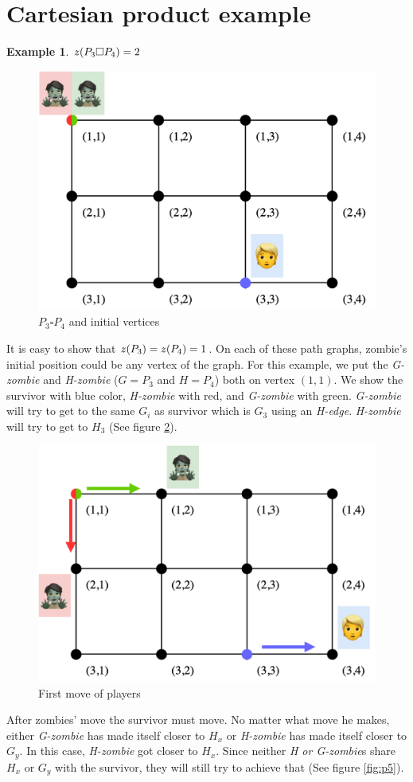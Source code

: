 \documentclass[1p]{elsarticle}
\newtheorem{example}[theorem]{Example}
\newcommand{\zn}{\ooalign{$z$\cr\hfil\rule[.5ex]{.2em}{.08ex}\hfil\cr}}
\begin{document}
\newpage
\appendix
\section{Cartesian product example} \label{cartesianProductExample}
\begin{example} $\zn(P_3 \square P_4 ) = 2$
\end{example}

\begin{figure}[h!]
	\centering
	\includegraphics[width=0.5\linewidth]{fig/p34m1.png}
	\caption{$P_3 \square P_4$ and initial vertices}
	\label{fig:p3}
\end{figure}

It is easy to show that $\zn(P_3) = \zn(P_4) = 1$. On each of these path graphs, zombie's initial position could be any
vertex of the graph. For this example, we put the {\it G-zombie} and {\it H-zombie} ($G = P_3$ and $H = P_4$) both on
vertex $(1,1)$. We show the survivor with blue color, {\it H-zombie} with red, and {\it G-zombie} with green. {\it
G-zombie} will try to get to the same $G_{i}$ as survivor which is $G_3$ using an {\it H-edge}. {\it H-zombie} will try
to get to $H_3$ (See figure \ref{fig:p4}).

\begin{figure}[h!]
	\centering
	\includegraphics[width=0.5\linewidth]{fig/p34m2.png}
	\caption{First move of players}
	\label{fig:p4}
\end{figure}

After zombies' move the survivor must move. No matter what move he makes, either {\it G-zombie} has made itself closer
to $H_x$ or {\it H-zombie} has made itself closer to $G_y$. In this case, {\it H-zombie} got closer to $H_x$. Since
neither {\it H or G-zombie}s share $H_x$ or $G_y$ with the survivor, they will still try to achieve that (See figure \ref{fig:p5}).
\end{document}
